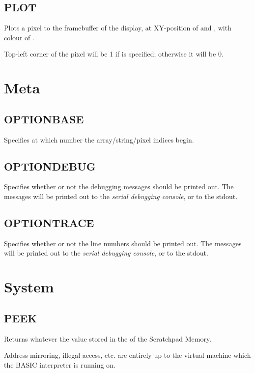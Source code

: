     \subsection{PLOT}
        \par
        Plots a pixel to the framebuffer of the display, at XY-position of  and , with colour of .\par
        Top-left corner of the pixel will be 1 if  is specified; otherwise it will be 0.

\section{Meta}

    \subsection{OPTIONBASE}
        \par
        Specifies at which number the array/string/pixel indices begin.
    \subsection{OPTIONDEBUG}
        \par
        Specifies whether or not the debugging messages should be printed out. The messages will be printed out to the \emph{serial debugging console}, or to the stdout.
    \subsection{OPTIONTRACE}
        \par
        Specifies whether or not the line numbers should be printed out. The messages will be printed out to the \emph{serial debugging console}, or to the stdout.

\section{System}

    \subsection{PEEK}
        \par
        Returns whatever the value stored in the  of the Scratchpad Memory.\par
        Address mirroring, illegal access, etc. are entirely up to the virtual machine which the BASIC interpreter is running on.
